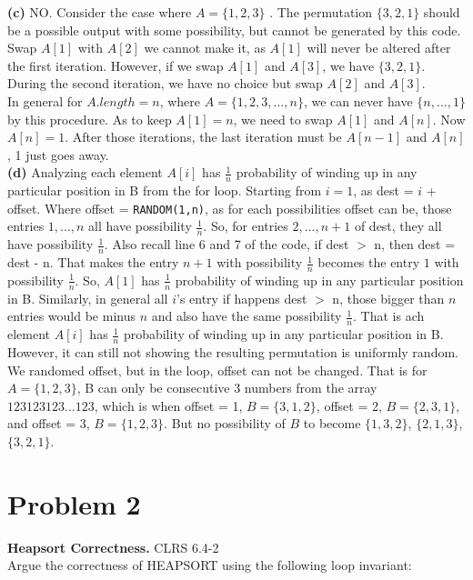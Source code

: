 \documentclass{article}
\begin{document}
\textbf{(c)}
NO. Consider the case where  $A=\{1,2,3\}$ . The permutation $\{3,2,1\}$ should be a possible output with some possibility, but cannot be generated by this code. Swap $A[1]$ with $A[2]$ we cannot make it, as $A[1]$ will never be altered after the first iteration. However, if we swap $A[1]$ and $A[3]$, we have $\{3,2,1\}$. During the second iteration, we have no choice but swap $A[2]$ and $A[3]$.\\
In general for $A.length = n$, where $A=\{1,2,3,...,n\}$, we can never have $\{n,...,1\}$ by this procedure. As to keep $A[1]=n$, we need to swap $A[1]$ and $A[n]$. Now $A[n]=1$. After those iterations, the last iteration must be $A[n-1]$ and $A[n]$, 1 just goes away.\\
\textbf{(d)} Analyzing each element $A[i]$ has $\frac{1}{n}$ probability of winding up in any particular position in B from the for loop. Starting from $i = 1$, as dest = $i$ + offset. Where offset = \texttt{RANDOM(1,n)}, as for each possibilities offset can be, those entries $1,...,n$ all have possibility $\frac{1}{n}$. So, for entries $2,...,n+1$ of dest, they all have possibility $\frac{1}{n}$. Also recall line 6 and 7 of the code, if dest $>$ n, then dest = dest - n. That makes the entry $n+1$ with possibility $\frac{1}{n}$ becomes the entry $1$ with possibility $\frac{1}{n}$. So, $A[1]$ has $\frac{1}{n}$ probability of winding up in any particular position in B. Similarly, in general all $i$'s entry if happens dest $>$ n, those bigger than $n$ entries would be minus $n$ and also have the same possibility $\frac{1}{n}$. That is ach element $A[i]$ has $\frac{1}{n}$ probability of winding up in any particular position in B.\\
However, it can still not showing the resulting permutation is uniformly random. We randomed offset, but in the loop, offset can not be changed. That is for $A=\{1,2,3\}$, B can only be consecutive 3 numbers from the array $123123123...123$, which is when offset = 1, $B=\{3,1,2\}$, offset = 2, $B=\{2,3,1\}$, and offset = 3, $B=\{1,2,3\}$. But no possibility of $B$ to become $\{1,3,2\}$, $\{2,1,3\}$, $\{3,2,1\}$.
\section*{Problem 2}
\textbf{Heapsort Correctness.} CLRS 6.4-2\\
Argue the correctness of HEAPSORT using the following loop invariant:
\end{document}
